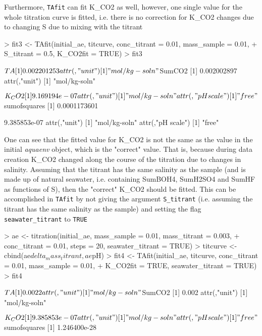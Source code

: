 \documentclass[article,nojss]{jss}
\begin{document}
Furthermore, \texttt{TAfit} can fit K\_CO2 as well, however, one single value for the whole titration curve is fitted, i.e. there is no correction for K\_CO2 changes due to changing S due to mixing with the titrant
\begin{Schunk}
\begin{Sinput}
> fit3 <- TAfit(initial_ae, titcurve, conc_titrant = 0.01, mass_sample = 0.01, 
+     S_titrant = 0.5, K_CO2fit = TRUE)
> fit3
\end{Sinput}
\begin{Soutput}
$TA
[1] 0.002201253
attr(,"unit")
[1] "mol/kg-soln"

$SumCO2
[1] 0.002002897
attr(,"unit")
[1] "mol/kg-soln"

$K_CO2
[1] 9.169194e-07
attr(,"unit")
[1] "mol/kg-soln"
attr(,"pH scale")
[1] "free"

$sumofsquares
[1] 0.0001173601
\end{Soutput}
\begin{Soutput}
[1] 9.385853e-07
attr(,"unit")
[1] "mol/kg-soln"
attr(,"pH scale")
[1] "free"
\end{Soutput}
\end{Schunk}

One can see that the fitted value for K\_CO2 is not the same as the value in the initial \textit{aquaenv} object, which is the "correct" value. That is, because during data creation K\_CO2 changed along the course of the titration
due to changes in salinity. Assuming that the titrant has the same salinity as the sample (and is made up of natural seawater, i.e. containing SumBOH4, SumH2SO4 and SumHF as functions of S),
 then the "correct" K\_CO2 should be fitted. This can be accomplished in \texttt{TAfit} by not giving the argument \texttt{S\_titrant} (i.e. assuming the titrant has the 
same salinity as the sample) and 
setting the flag \texttt{seawater\_titrant} to \texttt{TRUE}

\begin{Schunk}
\begin{Sinput}
> ae <- titration(initial_ae, mass_sample = 0.01, mass_titrant = 0.003, 
+     conc_titrant = 0.01, steps = 20, seawater_titrant = TRUE)
> titcurve <- cbind(ae$delta_mass_titrant, ae$pH)
> fit4 <- TAfit(initial_ae, titcurve, conc_titrant = 0.01, mass_sample = 0.01, 
+     K_CO2fit = TRUE, seawater_titrant = TRUE)
> fit4
\end{Sinput}
\begin{Soutput}
$TA
[1] 0.0022
attr(,"unit")
[1] "mol/kg-soln"

$SumCO2
[1] 0.002
attr(,"unit")
[1] "mol/kg-soln"

$K_CO2
[1] 9.385853e-07
attr(,"unit")
[1] "mol/kg-soln"
attr(,"pH scale")
[1] "free"

$sumofsquares
[1] 1.246400e-28
\end{Soutput}
\end{Schunk}
\end{document}
